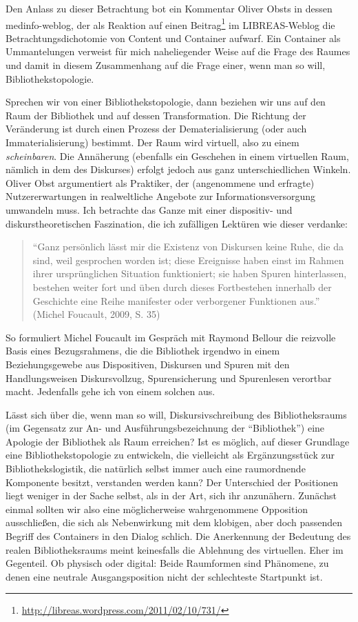 \documentclass[output=paper]{langscibook}
\begin{document}
Den Anlass zu dieser Betrachtung bot ein Kommentar Oliver Obsts in
dessen medinfo-weblog, der als Reaktion auf einen Beitrag\footnote{\url{http://libreas.wordpress.com/2011/02/10/731/}}
im LIBREAS-Weblog die Betrachtungsdichotomie von Content und Container
aufwarf. Ein Container als Ummantelungen verweist für mich naheliegender
Weise auf die Frage des Raumes und damit in diesem Zusammenhang auf die
Frage einer, wenn man so will, Bibliothekstopologie.

Sprechen wir von einer Bibliothekstopologie, dann beziehen wir uns auf
den Raum der Bibliothek und auf dessen Transformation. Die Richtung der
Veränderung ist durch einen Prozess der Dematerialisierung (oder auch
Immaterialisierung) bestimmt. Der Raum wird virtuell, also zu einem
\emph{scheinbaren}. Die Annäherung (ebenfalls ein Geschehen in einem
virtuellen Raum, nämlich in dem des Diskurses) erfolgt jedoch aus ganz
unterschiedlichen Winkeln. Oliver Obst argumentiert als Praktiker, der
(angenommene und erfragte) Nutzererwartungen in realweltliche Angebote
zur Informationsversorgung umwandeln muss. Ich betrachte das Ganze mit
einer dispositiv- und diskurstheoretischen Faszination, die ich
zufälligen Lektüren wie dieser verdanke:

\begin{quote}
\enquote{Ganz persönlich lässt mir die Existenz von Diskursen keine
Ruhe, die da sind, weil gesprochen worden ist; diese Ereignisse haben
einst im Rahmen ihrer ursprünglichen Situation funktioniert; sie haben
Spuren hinterlassen, bestehen weiter fort und üben durch dieses
Fortbestehen innerhalb der Geschichte eine Reihe manifester oder
verborgener Funktionen aus.} (Michel Foucault, 2009, S. 35)
\end{quote}

\noindent So formuliert Michel Foucault im Gespräch mit Raymond Bellour die
reizvolle Basis eines Bezugsrahmens, die die Bibliothek irgendwo in
einem Beziehungsgewebe aus Dispositiven, Diskursen und Spuren mit den
Handlungsweisen Diskursvollzug, Spurensicherung und Spurenlesen
verortbar macht. Jedenfalls gehe ich von einem solchen aus.

Lässt sich über die, wenn man so will, Diskursivschreibung des
Bibliotheksraums (im Gegensatz zur An- und Ausführungsbezeichnung der
\enquote{Bibliothek}) eine Apologie der Bibliothek als Raum erreichen?
Ist es möglich, auf dieser Grundlage eine Bibliothekstopologie zu
entwickeln, die vielleicht als Ergänzungsstück zur Bibliothekslogistik,
die natürlich selbst immer auch eine raumordnende Komponente besitzt,
verstanden werden kann? Der Unterschied der Positionen liegt weniger in
der Sache selbst, als in der Art, sich ihr anzunähern. Zunächst einmal
sollten wir also eine möglicherweise wahrgenommene Opposition
ausschließen, die sich als Nebenwirkung mit dem klobigen, aber doch
passenden Begriff des Containers in den Dialog schlich. Die Anerkennung
der Bedeutung des realen Bibliotheksraums meint keinesfalls die
Ablehnung des virtuellen. Eher im Gegenteil. Ob physisch oder digital:
Beide Raumformen sind Phänomene, zu denen eine neutrale Ausgangsposition
nicht der schlechteste Startpunkt ist.
\end{document}
